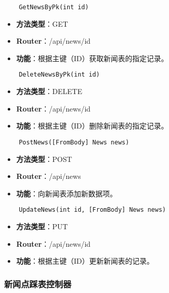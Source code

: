 \begin{verbatim}
	GetNewsByPk(int id)
\end{verbatim}

\begin{itemize}
	\item \textbf{方法类型}：GET
	\item \textbf{Router}：/api/news/{id}
	\item \textbf{功能}：根据主键（ID）获取新闻表的指定记录。
\end{itemize}

\begin{verbatim}
	DeleteNewsByPk(int id)
\end{verbatim}

\begin{itemize}
	\item \textbf{方法类型}：DELETE
	\item \textbf{Router}：/api/news/{id}
	\item \textbf{功能}：根据主键（ID）删除新闻表的指定记录。
\end{itemize}

\begin{verbatim}
	PostNews([FromBody] News news)
\end{verbatim}

\begin{itemize}
	\item \textbf{方法类型}：POST
	\item \textbf{Router}：/api/news
	\item \textbf{功能}：向新闻表添加新数据项。
\end{itemize}

\begin{verbatim}
	UpdateNews(int id, [FromBody] News news)
\end{verbatim}

\begin{itemize}
	\item \textbf{方法类型}：PUT
	\item \textbf{Router}：/api/news/{id}
	\item \textbf{功能}：根据主键（ID）更新新闻表的记录。
\end{itemize}

\subsubsection{新闻点踩表控制器}

